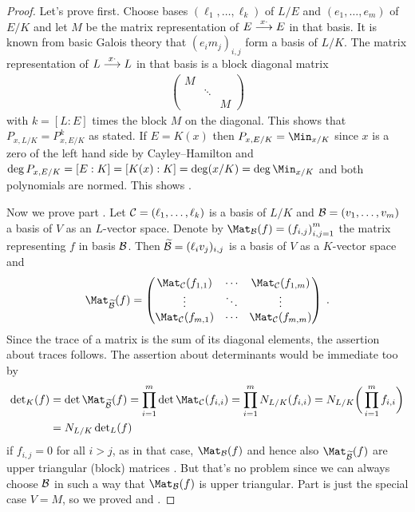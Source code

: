 \documentclass[a4paper,parskip=half,numbers=enddot, DIV=12]{scrreprt}
\begin{document}
\begin{proof}
		Let's prove  first. Choose bases $(\ell_1,\ldots,\ell_k)$ of $L/E$ and $(e_1,\ldots,e_m)$ of $E/K$ and let $M$ be the matrix representation of $E\morphism[x\cdot] E$ in that basis. It is known from basic Galois theory that $(e_im_j)_{i,j}$ form a basis of $L/K$. The matrix representation of $L\morphism[x\cdot] L$ in that basis is a block diagonal matrix 
		\begin{align*}
			\begin{pmatrix}
				M & & \\
				 & \ddots & \\
				  & & M
			\end{pmatrix}
		\end{align*}
		with $k=[L:E]$ times the block $M$ on the diagonal. This shows that $P_{x,L/K} = P_{x,E/K}^k$ as stated. If $E=K(x)$ then $P_{x,E/K} = \Min_{x/K}$ since $x$ is a zero of the left hand side by Cayley--Hamilton and $\deg P_{x,E/K} = [E:K] = [K(x):K] = \deg(x/K) = \deg \Min_{x/K}$ and both polynomials are normed. This shows .
		
		Now we prove part . Let $\mathcal{C}=(\ell_1,\ldots, \ell_k)$ is a basis of $L/K$ and $\mathcal{B}=(v_1,\ldots,v_m)$ a basis of $V$ as an $L$-vector space. Denote by $\Mat_\Bb(f) =\left(f_{i,j}\right)_{i,j=1}^m$ the matrix representing $f$ in basis $\mathcal{B}$. Then $\snake \Bb= (\ell_iv_j)_{i,j}$ is a basis of $V$ as a $K$-vector space and 
		\begin{align*}
			\Mat_{\snake{\Bb}}(f)=
			\begin{pmatrix}
				\Mat_{\Cc}(f_{1,1}) & \cdots & \Mat_\Cc(f_{1,m}) \\
				\vdots & \ddots & \vdots \\
				\Mat_\Cc(f_{m,1}) & \cdots & \Mat_\Cc(f_{m,m})
			\end{pmatrix}\;.
		\end{align*}		
		Since the trace of a matrix is the sum of its diagonal elements, the assertion about traces follows. The assertion about determinants would be immediate too by
		\begin{align*}
			\det_K(f)&=\det\Mat_{\snake \Bb}(f)=\prod_{i=1}^{m}\det\Mat_\Cc(f_{i,i})=\prod_{i=1}^{m}N_{L/K}(f_{i,i})=N_{L/K}\bigg(\prod_{i=1}^{m}f_{i,i}\bigg)\\
			&=N_{L/K}\det_L(f)
		\end{align*}
		if $f_{i,j}=0$ for all $i>j$, as in that case, $\Mat_\Bb(f)$ and hence also $\Mat_{\snake \Bb}(f)$ are upper triangular (block) matrices . But that's no problem since we can always choose $\mathcal{B}$ in such a way that $\Mat_\Bb(f)$ is upper triangular. Part  is just the special case $V=M$, so we proved  and .
		

\end{proof}
\end{document}
